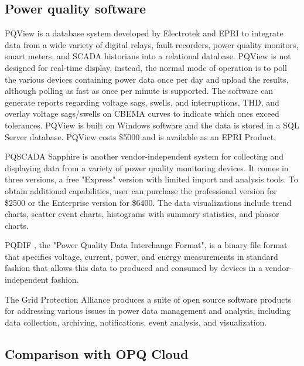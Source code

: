 \subsection{Power quality software}
\label{sec:commercial-pq-software}

PQView \cite{electrotek_concepts_pqview_2020} is a database system developed by Electrotek and EPRI to integrate data from a wide variety of digital relays, fault recorders, power quality monitors, smart meters, and SCADA historians into a relational database. PQView is not designed for real-time display, instead, the normal mode of operation is to poll the various devices containing power data once per day and upload the results, although polling as fast as once per minute is supported. The software can generate reports regarding voltage sags, swells, and interruptions, THD, and overlay voltage sags/swells on CBEMA curves to indicate which ones exceed tolerances. PQView is built on Windows software and the data is stored in a SQL Server database. PQView costs \$5000 and is available as an EPRI Product.

PQSCADA Sapphire \cite{elspec_ltd_pqscada_2016} is another vendor-independent system for collecting and displaying data from a variety of power quality monitoring devices. It comes in three versions, a free "Express" version with limited import and analysis tools. To obtain additional capabilities, user can purchase the professional version for \$2500 or the Enterprise version for \$6400. The data visualizations include trend charts, scatter event charts, histograms with summary statistics, and phasor charts.

PQDIF \cite{sabin_ieee_2020}, the "Power Quality Data Interchange Format", is a binary file format that specifies voltage, current, power, and energy measurements in standard fashion that allows this data to produced and consumed by devices in a vendor-independent fashion.

The Grid Protection Alliance \cite{grid_protection_alliance_grid_2020} produces a suite of open source software products for addressing various issues in power data management and analysis, including data collection, archiving, notifications, event analysis, and visualization.

\subsection*{Comparison with OPQ Cloud}

